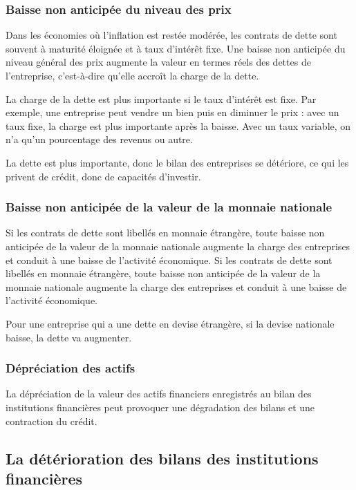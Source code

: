 		\subsubsection{Baisse non anticipée du niveau des prix}
		
		Dans les économies où l'inflation est restée modérée, les contrats de dette sont souvent à maturité éloignée et à taux d'intérêt fixe. Une baisse non anticipée du niveau général des prix augmente la valeur en termes réels des dettes de l'entreprise, c'est-à-dire qu'elle accroît la charge de la dette. 
		
		La charge de la dette est plus importante si le taux d'intérêt est fixe. Par exemple, une entreprise peut vendre un bien puis en diminuer le prix : avec un taux fixe, la charge est plus importante après la baisse. Avec un taux variable, on n'a qu'un pourcentage des revenus ou autre.
		
		La dette est plus importante, donc le bilan des entreprises se détériore, ce qui les privent de crédit, donc de capacités d'investir.
		
		\subsubsection{Baisse non anticipée de la valeur de la monnaie nationale}
		
		Si les contrats de dette sont libellés en monnaie étrangère, toute baisse non anticipée de la valeur de la monnaie nationale augmente la charge des entreprises et conduit à une baisse de l'activité économique. Si les contrats de dette sont libellés en monnaie étrangère, toute baisse non anticipée de la valeur de la monnaie nationale augmente la charge des entreprises et conduit à une baisse de l'activité économique.
		
		Pour une entreprise qui a une dette en devise étrangère, si la devise nationale baisse, la dette va augmenter.
		
		\subsubsection{Dépréciation des actifs}
		
		La dépréciation de la valeur des actifs financiers enregistrés au bilan des institutions financières peut provoquer une dégradation des bilans et une contraction du crédit.
		
	\subsection{La détérioration des bilans des institutions 
financières}

